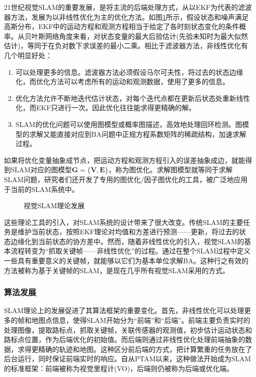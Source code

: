 21世纪视觉SLAM的重要发展，是将主流的后端处理方式，从以EKF为代表的滤波器方法，发展为以非线性优化为主的优化方法。如图\ref{fig1.1}所示，假设状态和噪声满足高斯分布，EKF中的运动方程和观测方程相当于给定了各时刻状态变化的条件概率。从贝叶斯网络角度来看，对状态变量的最大后验估计(先验未知时为最大似然估计)，等同于在负对数下求误差的最小二乘\upcite{[1.36]}。相比于滤波器方法，非线性优化有几个明显好处：
\begin{enumerate}[label={(\arabic*)}]
\item 可以处理更多的信息。滤波器方法必须假设马尔可夫性，将过去的状态边缘化，而优化方法可以考虑所有的运动和观测数据，使用了更多的信息。
\item 优化方法允许不断地迭代估计状态，对每个迭代点都在更新后状态处重新线性化，而EKF只进行一次。因此优化往往能求得更精确的解。
\item SLAM的优化问题可以使用图模型或概率图描述，高效地处理回环检测。图模型的求解又能直接对应到BA问题中正规方程系数矩阵的稀疏结构，加速求解过程。
\end{enumerate}

如果将优化变量抽象成节点，把运动方程和观测方程引入的误差抽象成边，就能得到SLAM对应的图模型$\boldsymbol{G}=\lbrace \boldsymbol{V}, \boldsymbol{E} \rbrace$，称为图优化\upcite{[1.37]}。求解图模型就等同于求解SLAM问题，研究者们还开发了专用的图优化/因子图优化的工具\upcite{[1.37],[1.38]}，被广泛地应用于当前的SLAM系统中。

\begin{figure}
    \centering
     \caption{视觉SLAM理论发展}
\label{fig1.1}
\end{figure}


这些理论工具的引入，对SLAM系统的设计带来了很大改变。传统SLAM的主要任务是维护当前状态，按照EKF理论对均值和方差进行预测——更新，将过去的状态边缘化到当前状态的协方差中。然而，随着非线性优化的引入，视觉SLAM的基本流程转变为“抓取关键帧——非线性优化”的过程。通过在整个SLAM过程中定义一些具有重要意义的关键帧，就能够以它们为基本单位求解BA。这种行之有效的方法被称为基于关键帧的SLAM，是现在几乎所有视觉SLAM采用的方式。



\subsubsection{算法发展}
SLAM理论上的发展促进了其算法框架的重要变化。首先，非线性优化可以处理更多的帧和地图点信息，使得SLAM开始分为“前端”和“后端”。前端主要负责实时的处理图像，提取路标点，抓取关键帧，关联传感器的观测值，初步估计运动状态和路标点位置，作为后端优化的初始值。而后端则通过非线性优化处理前端抽象的数据，求得更精确的轨迹和地图。这种区分前后端的方式，把计算繁重的任务放在了后台运行，同时保证前端实时的响应。自从PTAM以来，这种做法开始成为SLAM的标准框架：前端被称为视觉里程计(VO)\upcite{[1.39]}，后端则仍被称为后端或优化端。

